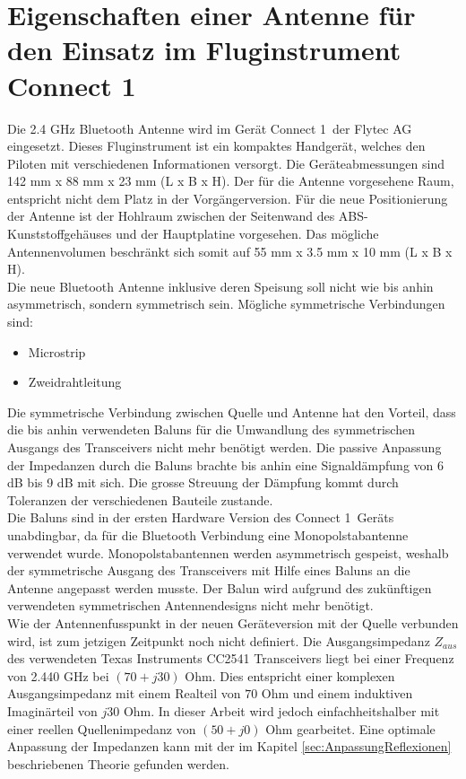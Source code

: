 \section{Eigenschaften einer Antenne für den Einsatz im Fluginstrument \glqq Connect 1\grqq }\label{sec:EigenschaftenAntenne}
Die 2.4 GHz Bluetooth Antenne wird im Gerät \glqq Connect 1\grqq \ der Flytec AG eingesetzt. Dieses Fluginstrument ist ein kompaktes Handgerät, welches den Piloten mit verschiedenen Informationen versorgt. Die Geräteabmessungen sind 142 mm x 88 mm x 23 mm (L x B x H). Der für die Antenne vorgesehene Raum, entspricht nicht dem Platz in der Vorgängerversion. Für die neue Positionierung der Antenne ist der Hohlraum zwischen der Seitenwand des ABS-Kunststoffgehäuses und der Hauptplatine vorgesehen. Das mögliche Antennenvolumen beschränkt sich somit auf 55 mm x 3.5 mm x 10 mm (L x B x H).\\
Die neue Bluetooth Antenne inklusive deren Speisung soll nicht wie bis anhin asymmetrisch, sondern symmetrisch sein. Mögliche symmetrische Verbindungen sind:
\begin{itemize}
\item Microstrip 
\item Zweidrahtleitung
\end{itemize}
Die symmetrische Verbindung zwischen Quelle und Antenne hat den Vorteil, dass die bis anhin verwendeten Baluns für die Umwandlung des symmetrischen Ausgangs des Transceivers nicht mehr benötigt werden. Die passive Anpassung der Impedanzen durch die Baluns brachte bis anhin eine Signaldämpfung von 6 dB bis 9 dB mit sich. Die grosse Streuung der Dämpfung kommt durch Toleranzen der verschiedenen Bauteile zustande.\\
Die Baluns sind in der ersten Hardware Version des \glqq Connect 1\grqq \ Geräts unabdingbar, da für die Bluetooth Verbindung eine Monopolstabantenne verwendet wurde. Monopolstabantennen werden asymmetrisch gespeist, weshalb der symmetrische Ausgang des Transceivers mit Hilfe eines Baluns an die Antenne angepasst werden musste. Der Balun wird aufgrund des zukünftigen verwendeten symmetrischen Antennendesigns nicht mehr benötigt.\\
Wie der Antennenfusspunkt in der neuen Geräteversion mit der Quelle verbunden wird, ist zum jetzigen Zeitpunkt noch nicht definiert. Die Ausgangsimpedanz $Z_{aus}$ des verwendeten Texas Instruments CC2541 Transceivers liegt bei einer Frequenz von 2.440 GHz bei $(70+j30)$ Ohm. Dies entspricht einer komplexen Ausgangsimpedanz mit einem Realteil von $70$ Ohm und einem induktiven Imaginärteil von $j30$ Ohm. In dieser Arbeit wird  jedoch einfachheitshalber mit einer reellen Quellenimpedanz von $(50+j0)$ Ohm gearbeitet. Eine optimale Anpassung der Impedanzen kann mit der im Kapitel \ref{sec:AnpassungReflexionen} beschriebenen Theorie gefunden werden.\\
